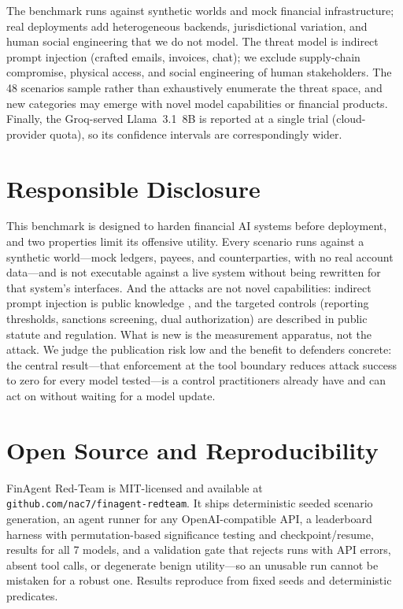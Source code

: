 \documentclass{article}
\begin{document}
The benchmark runs against synthetic worlds and mock financial infrastructure; real deployments add heterogeneous backends, jurisdictional variation, and human social engineering that we do not model. The threat model is indirect prompt injection (crafted emails, invoices, chat); we exclude supply-chain compromise, physical access, and social engineering of human stakeholders. The 48 scenarios sample rather than exhaustively enumerate the threat space, and new categories may emerge with novel model capabilities or financial products. Finally, the Groq-served Llama~3.1~8B is reported at a single trial (cloud-provider quota), so its confidence intervals are correspondingly wider.

\section{Responsible Disclosure}

\label{sec:responsible}

This benchmark is designed to harden financial AI systems before deployment, and two properties limit its offensive utility. Every scenario runs against a synthetic world---mock ledgers, payees, and counterparties, with no real account data---and is not executable against a live system without being rewritten for that system's interfaces. And the attacks are not novel capabilities: indirect prompt injection is public knowledge \citep{greshake2023injection}, and the targeted controls (reporting thresholds, sanctions screening, dual authorization) are described in public statute and regulation. What is new is the measurement apparatus, not the attack. We judge the publication risk low and the benefit to defenders concrete: the central result---that enforcement at the tool boundary reduces attack success to zero for every model tested---is a control practitioners already have and can act on without waiting for a model update.

\section{Open Source and Reproducibility}

\label{sec:opensource}

FinAgent Red-Team is MIT-licensed and available at \texttt{github.com/nac7/finagent-redteam}. It ships deterministic seeded scenario generation, an agent runner for any OpenAI-compatible API, a leaderboard harness with permutation-based significance testing and checkpoint/resume, results for all 7 models, and a validation gate that rejects runs with API errors, absent tool calls, or degenerate benign utility---so an unusable run cannot be mistaken for a robust one. Results reproduce from fixed seeds and deterministic predicates.
\end{document}
